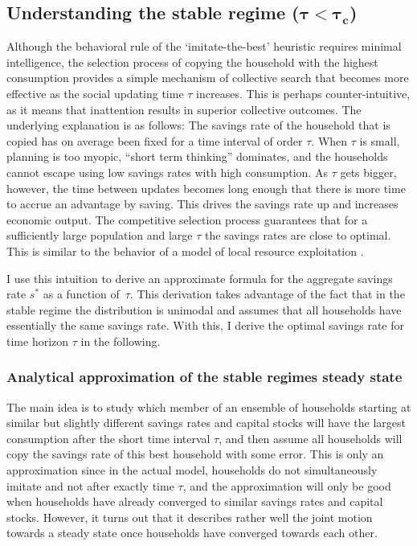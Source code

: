 \subsection{Understanding the stable regime ($\mathbf{\tau \! < \! \tau_{c} }$)}

Although the behavioral rule of the `imitate-the-best' heuristic requires minimal intelligence, the selection process of copying the household with the highest consumption provides a simple mechanism of collective search that becomes more effective as the social updating time $\tau$ increases.  This is perhaps counter-intuitive, as it means that inattention results in superior collective outcomes. The underlying explanation is as follows:  The  savings rate of the household that is copied has on average been fixed for a time interval of order $\tau$. When $\tau$ is small, planning is too myopic, ``short term thinking'' dominates, and the households cannot escape using low savings rates with high consumption.  As $\tau$ gets bigger, however, the time between updates becomes long enough that there is more time to accrue an advantage by saving. This drives the savings rate up and increases economic output. The competitive selection process guarantees that for a sufficiently large population and large $\tau$ the savings rates are close to optimal. This is similar to the behavior of a model of local resource exploitation \cite{Wiedermann2015}.

I use this intuition to derive an approximate formula for the aggregate savings rate $s^*$ as a function of~$\tau$. This derivation takes advantage of the fact that in the stable regime the distribution is unimodal and assumes that all households have essentially the same savings rate. With this, I derive the optimal savings rate for time horizon $\tau$ in the following.\\ 

\subsubsection{Analytical approximation of the stable regimes steady state}
\label{sec:rck_stable_regime}
The main idea is to study which member of an ensemble of households starting at similar but slightly different savings rates and capital stocks will have the largest consumption after the short time interval $\tau$, 
and then assume all households will copy the savings rate of this best household with some error. 
This is only an approximation since in the actual model, households do not simultaneously imitate and not after exactly time $\tau$, and the approximation will only be good when households have already converged to similar savings rates and capital stocks.
However, it turns out that it describes rather well the joint motion towards a steady state once households have converged towards each other.

